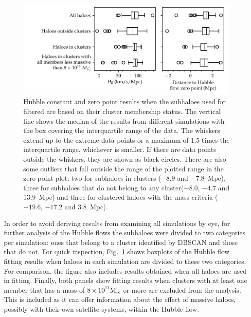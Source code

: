 \documentclass[english, oneside]{HYgradu}
\begin{document}
\begin{figure}
    \centering
    \includegraphics{kuvat/clusteredHFparameters.pdf}
    \caption{Hubble constant and zero point results when the subhaloes used for filtered are based on their cluster membership status. The vertical line shows the median of the results from different simulations with the box covering the interquartile range of the data. The whiskers extend up to the extreme data points or a maximum of 1.5 times the interquartile range, whichever is smaller. If there are data points outside the whiskers, they are shown as black circles. There are also some outliers that fall outside the range of the plotted range in the zero point plot: two for subhaloes in clusters ($-8.9$ and $-7.8$~Mpc), three for subhaloes that do not belong to any cluster($-8.0$, $-4.7$ and $13.9$~Mpc) and three for clustered haloes with the mass criteria ($-19.6$, $-17.2$ and $3.8$~Mpc).}\label{fig:clusteredHFparameters}
\end{figure}

In order to avoid deriving results from examining all simulations by eye, for further analysis of the Hubble flows the subhaloes were divided to two categories per simulation: ones that belong to a cluster identified by DBSCAN and those that do not. For quick inspection, Fig.~\ref{fig:clusteredHFparameters} shows boxplots of the Hubble flow fitting results when haloes in each simulation are divided to these two categories. For comparison, the figure also includes results obtained when all haloes are used in fitting. Finally, both panels show fitting results when clusters with at least one member that has a mass of $8 \times 10^{11} \mathrm{M}_{\astrosun}$ or more are excluded from the analysis. This is included as it can offer information about the effect of massive haloes, possibly with their own satellite systems, within the Hubble flow.
\end{document}
